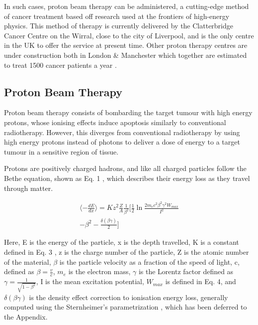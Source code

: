 \documentclass[a4paper, 12pt, conference]
{ieeeconf}      %
\begin{document}
In such cases, proton beam therapy can be administered, a cutting-edge method of cancer treatment based off research used at the frontiers of high-energy physics. This method of therapy is currently delivered by the Clatterbridge Cancer Centre on the Wirral, close to the city of Liverpool, and is the only centre in the UK to offer the service at present time. Other proton therapy centres are under construction both in London \& Manchester which together are estimated to treat 1500 cancer patients a year \cite{hep}.


\subsection{Proton Beam Therapy}

Proton beam therapy consists of bombarding the target tumour with high energy protons, whose ionising effects induce apoptosis similarly to conventional radiotherapy. However, this diverges from conventional radiotherapy by using high energy protons instead of photons to deliver a dose of energy to a target tumour in a sensitive region of tissue. 

Protons are positively charged hadrons, and like all charged particles follow the Bethe equation, shown as Eq. 1 \cite{bethe}, which describes their energy loss as they travel through matter.

\begin{equation}
\begin{split}
\langle -\frac{dE}{dx} \rangle = K z^2 \frac{Z}{A} \frac{1}{\beta ^2} \biggl[\frac{1}{2} \ln{\frac{2 m_e c^2 \beta^2 \gamma^2 W_{max}}{I^2}} \\
- \beta^2 - \frac{\delta (\beta \gamma)}{2}\biggr]
\end{split}
\end{equation}

Here, E is the energy of the particle, x is the depth travelled, K is a constant defined in Eq. 3 \cite{bethe}, z is the charge number of the particle, Z is the atomic number of the material, $\beta$ is the particle velocity as a fraction of the speed of light, c, defined as $\beta = \frac{v}{c}$, $m_e$ is the electron mass, $\gamma$ is the Lorentz factor defined as $\gamma = \frac{1}{\sqrt{1 - \beta^2}}$, I is the mean excitation potential, $W_{max}$ is defined in Eq. 4, and $\delta (\beta \gamma)$ is the density effect correction to ionisation energy loss, generally computed using the Sternheimer's parametrization \cite{bethe}, which has been deferred to the Appendix.
\end{document}
